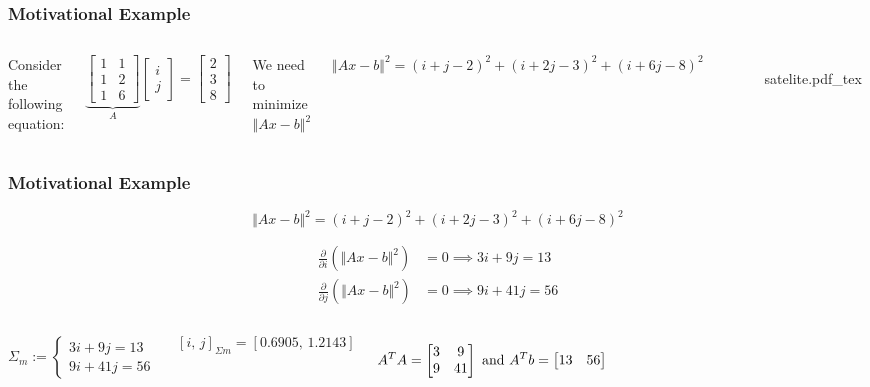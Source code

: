 \documentclass[aspectratio=169]{beamer}
\newcommand{\incfig}[2][1]{%
    \def\svgwidth{#1\columnwidth}
    {#2.pdf_tex} }
\begin{document}
\begin{frame} %
	\frametitle{Motivational Example}  %
	\begin{columns}


	Consider the following equation:

	\begin{equation*}
		\underbrace{\begin{bmatrix} 1 & 1 \\ 1 & 2 \\ 1 & 6 \end{bmatrix}}_A \begin{bmatrix} i \\ j  \end{bmatrix} = \begin{bmatrix} 2 \\ 3 \\ 8 \end{bmatrix}
	\end{equation*}

	We need to minimize $ \Vert Ax - b  \Vert^2$

	\[ \Vert Ax - b  \Vert^2 = (i + j -2)^2 + (i + 2j -3)^2 + (i + 6j -8)^2 \] 
		

	\begin{figure}[ht]
    		\centering
	    \incfig{satelite}
	\end{figure}
	\end{columns}

\end{frame}

\begin{frame}[t]
	\frametitle{Motivational Example}  %
	
	\[ \Vert Ax - b  \Vert^2 = (i + j -2)^2 + (i + 2j -3)^2 + (i + 6j -8)^2 \] 

	\begin{align*}
		\frac{\partial}{\partial i}(\Vert Ax - b  \Vert^2 ) &= 0 \implies 3i  + 9j = 13 \\
		\frac{\partial}{\partial j}(\Vert Ax - b  \Vert^2 ) &= 0 \implies 9i + 41 j = 56
	\end{align*}

\begin{columns}	


\[ \Sigma_m := \left\{ \begin{matrix} 3i  + 9j = 13 \\ 9i + 41 j = 56 \end{matrix} \right. \]

\[  [i, \, j]_{\Sigma m} = [0.6905 , \, 1.2143] \]

\[ A^TA = \begin{bmatrix} 3 & 9 \\ 9 & 41 \end{bmatrix} \textnormal{ and } A^T b =  \begin{bmatrix} 13 & 56 \end{bmatrix} \] 

\end{columns}
\end{frame}
\end{document}
